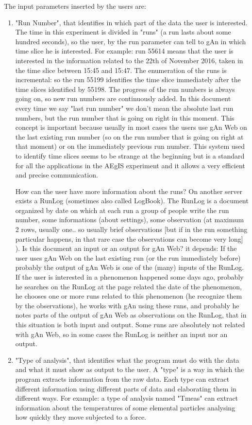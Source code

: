 The input parameters inserted by the users are:
\begin{enumerate}

\item "Run Number", that identifies in which part of the data the user is interested. 
The time in this experiment is divided in "runs" (a run lasts about some hundred seconds), so the user, by the run parameter can tell to gAn in which time slice he is interested. For example: run 55614 means that the user is interested in the information related to the 22th of November 2016, taken in the time slice between 15:45 and 15:47. 
The enumeration of the runs is incremental: so the run 55199 identifies the time slice immediately after the time slices identified by 55198. The progress of the run numbers is always going on, so new run numbers are continuously added. 
In this document every time we say "last run number" we don't mean the absolute last run numbers, but the run number that is going on right in this moment. This concept is important because usually in most cases the users use gAn Web on the last existing run number (so on the run number that is going on right at that moment) or on the immediately previous run number.  
This system used to identify time slices seems to be strange at the beginning but is a standard for all the applications in the AEgIS experiment and it allows a very efficient and precise communication.

How can the user have more information about the runs? 
On another server exists a RunLog (sometimes also called LogBook). The RunLog is a document organized by date on which at each run a group of people write the run number, some informations (about settings), some observation (at maximum 2 rows, usually one.. so usually brief observations [but if in the run something particular happens, in that rare case the observations can become very long] ). 
Is this document an input or an output for gAn Web? it depends:
If the user uses gAn Web on the last existing run (or the run immediately before) probably the output of gAn Web is one of the (many) inputs of the RunLog.  
If the user is interested in a phenomenon happened some days ago, probably he searches on the RunLog at the page related the date of the phenomenon, he chooses one or more runs related to this phenomenon (he recognize them by the observations), he works with gAn using these runs, and probably he notes parts of the output of gAn Web as observations on the RunLog, that in this situation is both input and output. Some runs are absolutely not related with gAn Web, so in some cases the RunLog is neither an input nor an output.  

\item "Type of analysis", that identifies what the program must do with the data and what it must show as output to the user.
A "type" is a way in which the program extracts information from the raw data. Each type can extract different information using different parts of data and elaborating them in different ways. For example: a type of analysis named "Tmeas" can extract information about the temperatures of some elemental particles analysing how quickly they move subjected to a force. 

\end{enumerate}


